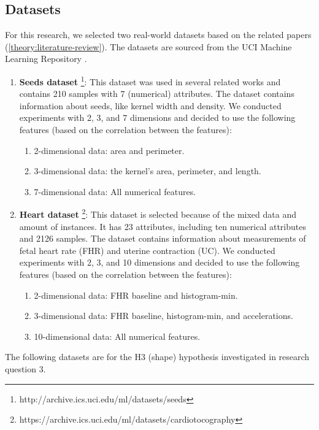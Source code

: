 \subsection{Datasets} \label{datasets-section}
For this research, we selected two real-world datasets based on the related papers (\ref{theory:literature-review}).
The datasets are sourced from the UCI Machine Learning Repository \citep{noauthor_uci_nodate}.
\begin{enumerate}
      \item \textbf{Seeds dataset} \footnote{http://archive.ics.uci.edu/ml/datasets/seeds}: This dataset was used in several related works and contains 210 samples with 7 (numerical) attributes.
            The dataset contains information about seeds, like kernel width and density.
            We conducted experiments with 2, 3, and 7 dimensions and decided to use the following features (based on the correlation between the features):
            \begin{enumerate}
                  \item 2-dimensional data: area and perimeter.
                  \item 3-dimensional data: the kernel's area, perimeter, and length.
                  \item 7-dimensional data: All numerical features.
            \end{enumerate}
      \item \textbf{Heart dataset} \footnote{https://archive.ics.uci.edu/ml/datasets/cardiotocography}: This dataset is selected because of the mixed data and amount of instances.
            It has 23 attributes, including ten numerical attributes and 2126 samples.
            The dataset contains information about measurements of fetal heart rate (FHR) and uterine contraction (UC).
            We conducted experiments with 2, 3, and 10 dimensions and decided to use the following features (based on the correlation between the features):
            \begin{enumerate}
                  \item 2-dimensional data: FHR baseline and histogram-min.
                  \item 3-dimensional data: FHR baseline, histogram-min, and accelerations.
                  \item 10-dimensional data: All numerical features.
            \end{enumerate}
\end{enumerate}
The following datasets are for the H3 (shape) hypothesis investigated in research question 3.
